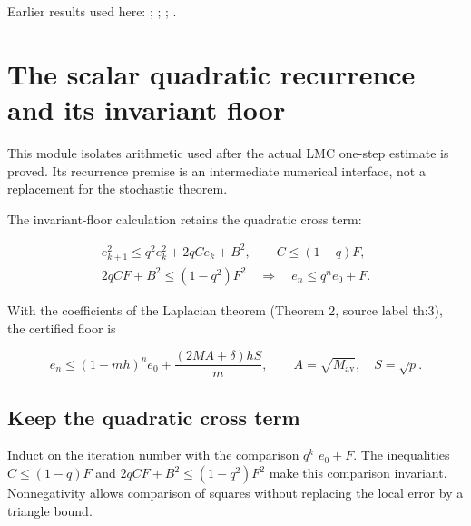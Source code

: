 \documentclass[11pt,a4paper]{report}
\begin{document}
Earlier results used here: \cite[Section~3.17.3]{LangevinLean2026ULASC}; \cite[Section~3.17.4]{LangevinLean2026ULASC}; \cite[Section~3.26.3]{LangevinLean2026ULASC}; \cite[Section~3.36.7]{LangevinLean2026ULASC}.
\section{\texorpdfstring{The scalar quadratic recurrence and its invariant floor}{The scalar quadratic recurrence and its invariant floor}}
\label{proof-module-AverageLMC-LaplacianRecurrence-lean}


This module isolates arithmetic used after the actual LMC one-step estimate is proved. Its recurrence premise is an intermediate numerical interface, not a replacement for the stochastic theorem.



The invariant-floor calculation retains the quadratic cross term:


\[\begin{gathered}
e_{k+1}^2\le q^2e_k^2+2qCe_k+B^2,\qquad
C\le(1-q)F,\\
2qCF+B^2\le(1-q^2)F^2
\quad\Longrightarrow\quad e_n\le q^ne_0+F.
\end{gathered}\]


With the coefficients of the Laplacian theorem (Theorem 2, source label th:3), the certified floor is


\[e_n\le(1-mh)^ne_0+\frac{(2MA+\delta)hS}{m},
\qquad A=\sqrt{M_{\mathrm{av}}},\quad S=\sqrt p.\]\subsection{\texorpdfstring{Keep the quadratic cross term}{Keep the quadratic cross term}}
\label{report-step-AverageLMC-LaplacianRecurrence-lean-1}


Induct on the iteration number with the comparison \(q^k\) \(e_{0}+F\). The inequalities \(C\le (1-q)F\) and \(2qCF+B^{2}\le (1-q^{2})F^{2}\) make this comparison invariant. Nonnegativity allows comparison of squares without replacing the local error by a triangle bound.
\end{document}
